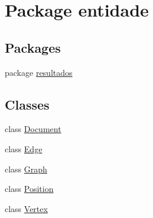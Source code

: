 \hypertarget{namespaceentidade}{}\section{Package entidade}
\label{namespaceentidade}
\subsection*{Packages}
\begin{DoxyCompactItemize}
\item 
package \hyperlink{namespaceentidade_1_1resultados}{resultados}
\end{DoxyCompactItemize}
\subsection*{Classes}
\begin{DoxyCompactItemize}
\item 
class \hyperlink{classentidade_1_1Document}{Document}
\item 
class \hyperlink{classentidade_1_1Edge}{Edge}
\item 
class \hyperlink{classentidade_1_1Graph}{Graph}
\item 
class \hyperlink{classentidade_1_1Position}{Position}
\item 
class \hyperlink{classentidade_1_1Vertex}{Vertex}
\end{DoxyCompactItemize}
